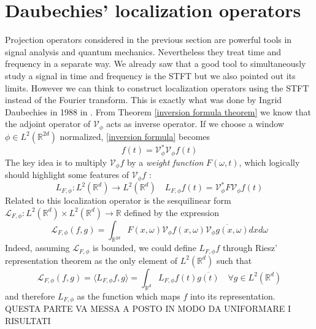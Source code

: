 \documentclass[corpo=11pt, stile=classica, tipotesi=custom,
greek, evenboxes, english]{toptesi}
\numberwithin{equation}{chapter}
\theoremstyle{remark}
\newcommand{\R}{\mathbb{R}} %
\newcommand{\V}{\mathcal{V}} %
\renewcommand{\L}{\mathscr{L}} %
\begin{document}
\section{Daubechies' localization operators}\label{Daubechies' localization operators section}
{\color{red} Projection operators considered in the previous section are powerful tools in signal analysis and quantum mechanics}. Nevertheless they treat time and frequency in a separate way. We already saw that a good tool to simultaneously study a signal in time and frequency is the STFT but we also pointed out its limits. {\color{red} However we can think to construct localization operators using the STFT instead of the Fourier transform}. This is exactly what was done by Ingrid Daubechies in 1988 in \cite{daubechies}. From Theorem \ref{inversion formula theorem} we know that the adjoint operator of $\V_{\phi}$ acts as inverse operator. If we choose a window $\phi \in L^2(\R^{2d})$ normalized, \ref{inversion formula} becomes
\begin{equation*}
	f(t) = \V_{\phi}^* \V_{\phi}f(t)
\end{equation*}
The key idea is to multiply $\V_{\phi} f$ by a \emph{weight function} $F(\omega,t)$, which logically should highlight some features of $\V_{\phi}f$ :
\begin{equation}\label{Daubechies' localization operator def}
	L_{F,\phi} : L^2(\R^d) \rightarrow L^2(\R^d) \quad L_{F,\phi}f(t) = \V_{\phi}^* F \V_{\phi} f(t)
\end{equation}
Related to this localization operator is the sesquilinear form $\L_{F,\phi} : L^2(\R^d) \times L^2(\R^d) \rightarrow \R$ defined by the expression
\begin{equation}\label{sesquilinear form localization operator}
	\L_{F,\phi}(f,g) = \int_{\R^{2d}} F(x,\omega) \V_{\phi}f(x,\omega) \overline{\V_{\phi}g(x,\omega)} dxd\omega
\end{equation}
Indeed, assuming $\L_{F,\phi}$ is bounded, we could define $ L_{F,\phi} f$ through Riesz' representation theorem as the only element of $L^2(\R^d)$ such that
\begin{equation}\label{L_F through duality}
	\L_{F,\phi}(f,g) = \langle L_{F,\phi}f,g \rangle  = \int_{\R^d} L_{F,\phi}f(t) \overline{g(t)}\quad \forall g \in L^2(\R^d)
\end{equation}
and therefore $L_{F,\phi}$ as the function which maps $f$ into its representation.\\
{\color{blue} QUESTA PARTE VA MESSA A POSTO IN MODO DA UNIFORMARE I RISULTATI}
\end{document}
